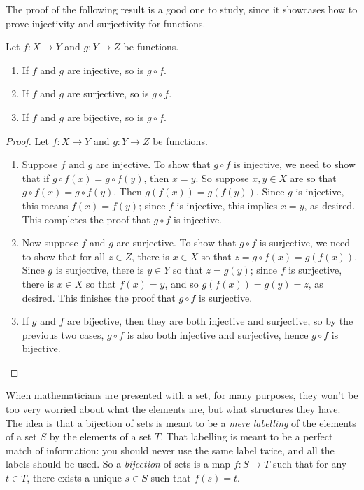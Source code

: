 \documentclass[11pt,dvipsnames]{book}
\numberwithin{figure}{section} %
\numberwithin{table}{section} %
\begin{document}
The proof of the following result is a good one to study, since it showcases how to prove injectivity and surjectivity for functions.

\begin{theorem}
Let $f:X\rightarrow Y$ and $g:Y\rightarrow Z$ be functions.
\begin{enumerate}
\item If $f$ and $g$ are injective, so is $g\circ f$.
\item If $f$ and $g$ are surjective, so is $g\circ f$.
\item If $f$ and $g$ are bijective, so is $g\circ f$.
\end{enumerate}
\end{theorem}

\begin{proof}
Let $f:X\rightarrow Y$ and $g:Y\rightarrow Z$ be functions.
\begin{enumerate}
\item Suppose $f$ and $g$ are injective. To show that $g\circ f$ is injective, we need to show that if $g\circ f(x)=g\circ f(y)$, then $x=y$. So suppose $x,y\in X$ are so that $g\circ f(x)=g\circ f(y)$. Then $g(f(x))=g(f(y))$. Since $g$ is injective, this means $f(x)=f(y)$; since $f$ is injective, this implies $x=y$, as desired. This completes the proof that $g\circ f$ is injective.
\item Now suppose $f$ and $g$ are surjective. To show that $g\circ f$ is surjective, we need to show that for all $z\in Z$, there is $x\in X$ so that $z=g\circ f(x)=g(f(x))$. Since $g$ is surjective, there is $y\in Y$ so that $z=g(y)$; since $f$ is surjective, there is $x\in X$ so that $f(x)=y$, and so $g(f(x))=g(y)=z$, as desired. This finishes the proof that $g\circ f$ is surjective.
\item If $g$ and $f$ are bijective, then they are both injective and surjective, so by the previous two cases, $g\circ f$ is also both injective and surjective, hence $g\circ f$ is bijective.
\end{enumerate}
\end{proof}

When mathematicians are presented with a set, for many purposes, they won't be too very worried about what the elements are, but what structures they have.
The idea is that a bijection of sets is meant to be a \emph{mere labelling} of the elements of a set $S$ by the elements of a set $T$.
That labelling is meant to be a perfect match of information:
you should never use the same label twice, and
all the labels should be used.
So a \emph{bijection} of sets is a map $f\colon S \to T$ such that for any $t\in T$, there exists a unique $s\in S$ such that $f(s)=t$.
\end{document}
